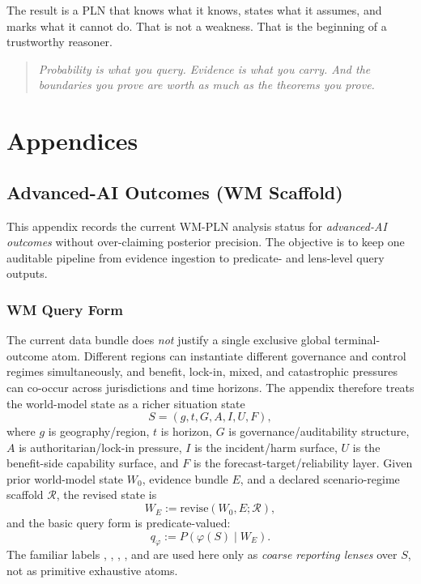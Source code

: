\documentclass[11pt,openany]{report}
\begin{document}
The result is a PLN that knows what it knows, states what it assumes,
and marks what it cannot do.  That is not a weakness.  That is the
beginning of a trustworthy reasoner.

\begin{quote}
\emph{Probability is what you query.  Evidence is what you carry.
  And the boundaries you prove are worth as much as the theorems you prove.}
\end{quote}


\part*{Appendices}
\appendix

\chapter{Advanced-AI Outcomes (WM Scaffold)}
\label{app:ai-outcomes}

This appendix records the current WM-PLN analysis status for
\emph{advanced-AI outcomes} without over-claiming posterior precision.
The objective is to keep one auditable pipeline from evidence ingestion
to predicate- and lens-level query outputs.

\section{WM Query Form}

The current data bundle does \emph{not} justify a single exclusive
global terminal-outcome atom.  Different regions can instantiate
different governance and control regimes simultaneously, and benefit,
lock-in, mixed, and catastrophic pressures can co-occur across
jurisdictions and time horizons.  The appendix therefore treats the
world-model state as a richer situation state
\[
  S = (g, t, G, A, I, U, F),
\]
where $g$ is geography/region, $t$ is horizon, $G$ is
governance/auditability structure, $A$ is authoritarian/lock-in
pressure, $I$ is the incident/harm surface, $U$ is the benefit-side
capability surface, and $F$ is the forecast-target/reliability layer.
Given prior world-model state $W_0$, evidence bundle $E$, and a declared
scenario-regime scaffold $\mathcal{R}$, the revised state is
\[
  W_E := \mathrm{revise}(W_0, E; \mathcal{R}),
\]
and the basic query form is predicate-valued:
\[
  q_{\varphi} := P(\varphi(S) \mid W_E).
\]
The familiar labels
,
,
,
, and  are used here
only as \emph{coarse reporting lenses} over $S$, not as primitive
exhaustive atoms.
\end{document}
